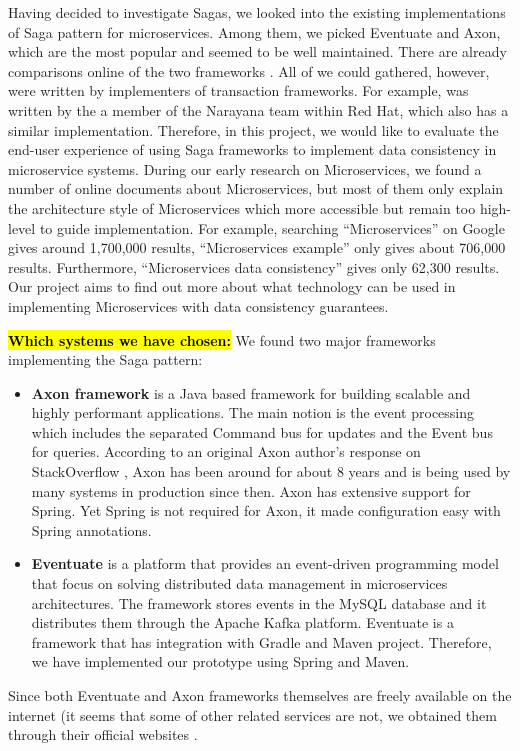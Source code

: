 Having decided to investigate Sagas, we looked into the existing implementations of Saga pattern for microservices. Among them, we picked Eventuate and Axon, which are the most popular and seemed to be well maintained. There are already comparisons online of the two frameworks \cite{comparison, stefanko}. All of we could gathered, however, were written by implementers of transaction frameworks. For example, \cite{stefanko} was written by the a member of the Narayana team within Red Hat, which also has a similar implementation. Therefore, in this project, we would like to evaluate the end-user experience of using Saga frameworks to implement data consistency in microservice systems.
During our early research on Microservices, we found a number of online documents about Microservices, but most of them only explain the architecture style of Microservices which more accessible but remain too high-level to guide implementation. For example, searching “Microservices” on Google gives around 1,700,000 results, “Microservices example” only gives about 706,000 results. Furthermore, “Microservices data consistency” gives only 62,300 results. Our project aims to find out more about what technology can be used in implementing Microservices with data consistency guarantees.

\hl{\textbf{Which systems we have chosen: }} We found two major frameworks implementing the Saga pattern:

\begin{itemize}
    \item \textbf{Axon framework} \cite{axon} is a Java based framework for building scalable and highly performant applications. The main notion is the event processing which includes the separated Command bus for updates and the Event bus for queries. According to an original Axon author’s response on StackOverflow \cite{comparison}, Axon has been around for about 8 years and is being used by many systems in production since then. Axon has extensive support for Spring. Yet Spring is not required for Axon, it made configuration easy with Spring annotations.
    \item \textbf{Eventuate} \cite{eventuate} is a platform that provides an event-driven programming model that focus on solving distributed data management in microservices architectures. The framework stores events in the MySQL database and it distributes them through the Apache Kafka platform. Eventuate is a framework that has integration with Gradle and Maven project. Therefore, we have implemented our prototype using Spring and Maven.
\end{itemize}

Since both Eventuate and Axon frameworks themselves are freely available on the internet (it seems that some of other related services are not, we obtained them through their official websites \cite{axon, eventuate}.
